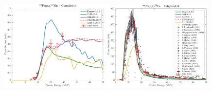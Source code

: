 \begin{figure}
 
 \includegraphics[width=0.49\textwidth]{./figures/56Mn.pdf}
 \includegraphics[width=0.49\textwidth]{./figures/56Co.pdf}

\vspace{-20pt} 
\end{figure}



